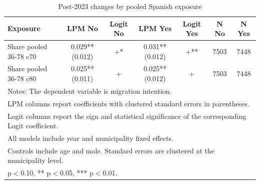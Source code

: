 \begin{table}[!htbp]
\centering
\caption{Post-2023 changes by pooled Spanish exposure}
\label{tab:post_pooled_share_lpm_logit}
\small
\begin{tabular}{lcccccc}
\hline
Exposure & LPM No & Logit No & LPM Yes & Logit Yes & N No & N Yes \\
\hline
Share pooled 36-78 c70 & 0.029** (0.012) & +* & 0.031** (0.012) & +** & 7503 & 7448 \\
Share pooled 36-78 c80 & 0.025** (0.011) & + & 0.025** (0.012) & + & 7503 & 7448 \\
\hline
\multicolumn{7}{l}{\footnotesize Notes: The dependent variable is migration intention.} \\
\multicolumn{7}{l}{\footnotesize LPM columns report coefficients with clustered standard errors in parentheses.} \\
\multicolumn{7}{l}{\footnotesize Logit columns report the sign and statistical significance of the corresponding Logit coefficient.} \\
\multicolumn{7}{l}{\footnotesize All models include year and municipality fixed effects.} \\
\multicolumn{7}{l}{\footnotesize Controls include age and male. Standard errors are clustered at the municipality level.} \\
\multicolumn{7}{l}{\footnotesize * p$<$0.10, ** p$<$0.05, *** p$<$0.01.} \\
\end{tabular}
\end{table}
